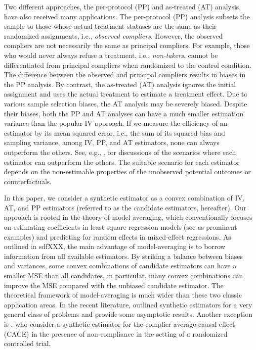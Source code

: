 \documentclass{article}
\begin{document}
Two different approaches, the per-protocol (PP) and as-treated (AT) analysis, have also received many applications. The per-protocol (PP) analysis subsets the sample to those whose actual treatment statuses are the same as their randomized assignments, i.e., \textit{observed compliers}.  However, the observed compliers are not necessarily the same as principal compliers. For example, those who would never always refuse a treatment, i.e., \textit{non-takers}, cannot be differentiated from principal compliers when randomized to the control condition.  The difference between the observed and principal compliers results in biases in the PP analysis. By contrast, the as-treated (AT) analysis ignores the initial assignment and uses the actual treatment to estimate a treatment effect.  Due to various sample selection biases, the AT analysis may be severely biased.  Despite their biases, both the PP and AT analyses can have a much smaller estimation variance than the popular IV approach. If we measure the efficiency of an estimator by its mean squared error, i.e., the sum of its squared bias and sampling variance, among IV, PP, and AT estimators, none can always outperform the others.  See, e.g., \citep{Little2018, antonelli2017synthetic}, for discussions of the scenarios where each estimator can outperform the others.  The suitable scenario for each estimator depends on the non-estimable properties of the unobserved potential outcomes or counterfactuals.  

In this paper, we consider a synthetic estimator as a convex combination of IV, AT, and PP estimators (referred to as the candidate estimators, hereafter).  Our approach is rooted in the theory of model averaging, which conventionally focuses on estimating coefficients in least square regression models (see \citep{hjort2003frequentist, hansen2007least} as prominent examples) and predicting for random effects in mixed-effect regressions.  As outlined in sdfXXX, the main advantage of model-averaging is to borrow information from all available estimators.  By striking a balance between biases and variances, some convex combinations of candidate estimators can have a smaller MSE than all candidates, in particular, many convex combinations can improve the MSE compared with the unbiased candidate estimator. The theoretical framework of model-averaging is much wider than these two classic application areas.  In the recent literature, \citep{lavancier2016general} outlined synthetic estimators for a very general class of problems and provide some asymptotic results. Another exception is \citet{antonelli2017synthetic}, who consider a synthetic estimator for the complier average causal effect (CACE) in the presence of non-compliance in the setting of a randomized controlled trial. 
\end{document}
